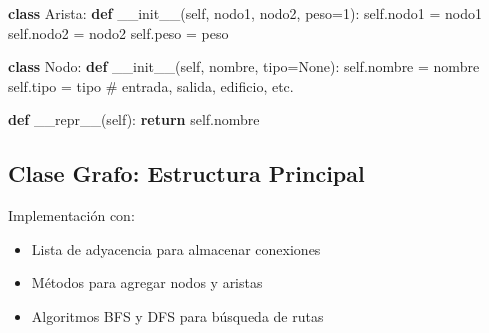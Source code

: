\documentclass[
  spanish,
  letterpaper,
  DIV=11,
  numbers=noendperiod]{scrartcl}
\newenvironment{Shaded}{\begin{snugshade}}{\end{snugshade}}
\newcommand{\CommentTok}[1]{\textcolor[rgb]{0.37,0.37,0.37}{#1}}
\newcommand{\ControlFlowTok}[1]{\textcolor[rgb]{0.00,0.23,0.31}{\textbf{#1}}}
\newcommand{\DecValTok}[1]{\textcolor[rgb]{0.68,0.00,0.00}{#1}}
\newcommand{\FunctionTok}[1]{\textcolor[rgb]{0.28,0.35,0.67}{#1}}
\newcommand{\KeywordTok}[1]{\textcolor[rgb]{0.00,0.23,0.31}{\textbf{#1}}}
\newcommand{\NormalTok}[1]{\textcolor[rgb]{0.00,0.23,0.31}{#1}}
\newcommand{\OperatorTok}[1]{\textcolor[rgb]{0.37,0.37,0.37}{#1}}
\newcommand{\VariableTok}[1]{\textcolor[rgb]{0.07,0.07,0.07}{#1}}
\begin{document}
\begin{Shaded}
\begin{Highlighting}[]
\KeywordTok{class}\NormalTok{ Arista:}
    \KeywordTok{def} \FunctionTok{\_\_init\_\_}\NormalTok{(}\VariableTok{self}\NormalTok{, nodo1, nodo2, peso}\OperatorTok{=}\DecValTok{1}\NormalTok{):}
        \VariableTok{self}\NormalTok{.nodo1 }\OperatorTok{=}\NormalTok{ nodo1}
        \VariableTok{self}\NormalTok{.nodo2 }\OperatorTok{=}\NormalTok{ nodo2}
        \VariableTok{self}\NormalTok{.peso }\OperatorTok{=}\NormalTok{ peso}

\KeywordTok{class}\NormalTok{ Nodo:}
    \KeywordTok{def} \FunctionTok{\_\_init\_\_}\NormalTok{(}\VariableTok{self}\NormalTok{, nombre, tipo}\OperatorTok{=}\VariableTok{None}\NormalTok{):}
        \VariableTok{self}\NormalTok{.nombre }\OperatorTok{=}\NormalTok{ nombre}
        \VariableTok{self}\NormalTok{.tipo }\OperatorTok{=}\NormalTok{ tipo  }\CommentTok{\# entrada, salida, edificio, etc.}

    \KeywordTok{def} \FunctionTok{\_\_repr\_\_}\NormalTok{(}\VariableTok{self}\NormalTok{):}
        \ControlFlowTok{return} \VariableTok{self}\NormalTok{.nombre}
\end{Highlighting}
\end{Shaded}

\subsection{Clase Grafo: Estructura
Principal}\label{clase-grafo-estructura-principal}

Implementación con:

\begin{itemize}
\item
  Lista de adyacencia para almacenar conexiones
\item
  Métodos para agregar nodos y aristas
\item
  Algoritmos BFS y DFS para búsqueda de rutas
\end{itemize}
\end{document}

